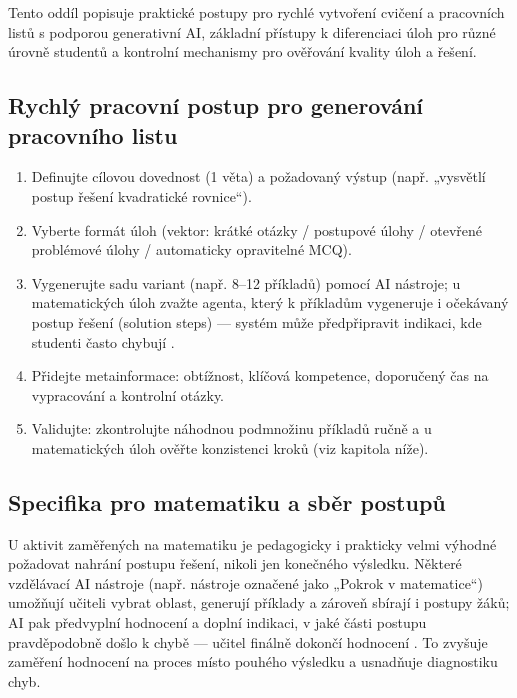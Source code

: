 \medskip

Tento oddíl popisuje praktické postupy pro rychlé vytvoření cvičení a pracovních listů s podporou generativní AI, základní přístupy k diferenciaci úloh pro různé úrovně studentů a kontrolní mechanismy pro ověřování kvality úloh a řešení.

\subsection*{Rychlý pracovní postup pro generování pracovního listu}
\begin{enumerate}
  \item Definujte cílovou dovednost (1 věta) a požadovaný výstup (např. „vysvětlí postup řešení kvadratické rovnice“).
  \item Vyberte formát úloh (vektor: krátké otázky / postupové úlohy / otevřené problémové úlohy / automaticky opravitelné MCQ).
  \item Vygenerujte sadu variant (např. 8–12 příkladů) pomocí AI nástroje; u matematických úloh zvažte agenta, který k příkladům vygeneruje i očekávaný postup řešení (solution steps) — systém může předpřipravit indikaci, kde studenti často chybují \cite{kb_ai_101_tipu_pdf_04e4a115_page_8_1}.
  \item Přidejte metainformace: obtížnost, klíčová kompetence, doporučený čas na vypracování a kontrolní otázky.
  \item Validujte: zkontrolujte náhodnou podmnožinu příkladů ručně a u matematických úloh ověřte konzistenci kroků (viz kapitola níže).
\end{enumerate}

\subsection*{Specifika pro matematiku a sběr postupů}
U aktivit zaměřených na matematiku je pedagogicky i prakticky velmi výhodné požadovat nahrání postupu řešení, nikoli jen konečného výsledku. Některé vzdělávací AI nástroje (např. nástroje označené jako „Pokrok v matematice“) umožňují učiteli vybrat oblast, generují příklady a zároveň sbírají i postupy žáků; AI pak předvyplní hodnocení a doplní indikaci, v jaké části postupu pravděpodobně došlo k chybě — učitel finálně dokončí hodnocení \cite{kb_ai_101_tipu_pdf_04e4a115_page_8_1}. To zvyšuje zaměření hodnocení na proces místo pouhého výsledku a usnadňuje diagnostiku chyb.


